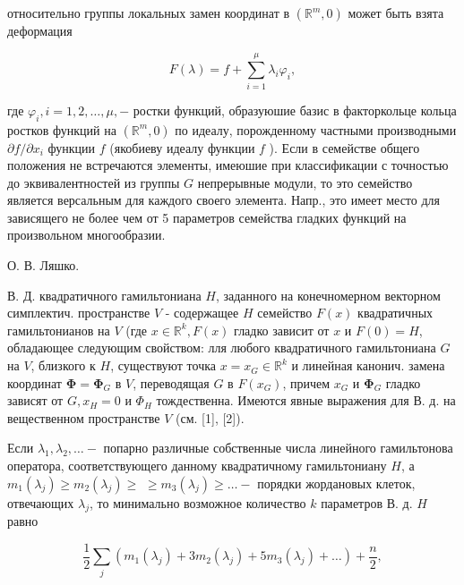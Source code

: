 \documentclass[10pt]{article}
\begin{document}
относительно группы локальных замен координат в $\left(\mathbb{R}^{m}, 0\right)$ может быть взята деформация



\[

F(\lambda)=f+\sum_{i=1}^{\mu} \lambda_{i} \varphi_{i},

\]



где $\varphi_{i}, i=1,2, \ldots, \mu,-$ ростки функций, образуюшие базис в факторкольце кольца ростков функций на $\left(\mathbb{R}^{m}, 0\right)$ по идеалу, порожденному частными производными $\partial f / \partial x_{i}$ функции $f$ (якобиеву идеалу функции $f$ ). Если в семействе общего положения не встречаются элементы, имеюшие при классификации с точностью до эквивалентностей из группы $G$ непрерывные модули, то это семейство является версальным для каждого своего элемента. Напр., это имеет место для зависящего не более чем от 5 параметров семейства гладких функций на произвольном многообразии.



О. В. Ляшко.



В. Д. квадратичного гамильтониана $H$, заданного на конечномерном векторном симплектич. пространстве $V$ - содержащее $H$ семейство $F(x)$ квадратичных гамильтонианов на $V$ (где $x \in \mathbb{R}^{k}, F(x)$ гладко зависит от $x$ и $F(0)=H$, обладающее следующим свойством: лля любого квадратичного гамильтониана $G$ на $V$, близкого к $H$, существуют точка $x=x_{G} \in \mathbb{R}^{k}$ и линейная канонич. замена координат $\boldsymbol{\Phi}=\boldsymbol{\Phi}_{G}$ в $V$, переводящая $G$ в $F\left(x_{G}\right)$, причем $x_{G}$ и $\boldsymbol{\Phi}_{G}$ гладко зависят от $G, x_{H}=0$ и $\Phi_{H}$ тождественна. Имеются явные выражения для В. д. на вещественном пространстве $V$ (см. [1], [2]).



Если $\lambda_{1}, \lambda_{2}, \ldots-$ попарно различные собственные числа линейного гамильтонова оператора, соответствующего данному квадратичному гамильтониану $H$, а $m_{1}\left(\lambda_{j}\right) \geqslant m_{2}\left(\lambda_{j}\right) \geqslant$ $\geqslant m_{3}\left(\lambda_{j}\right) \geqslant \ldots-$ порядки жордановых клеток, отвечающих $\lambda_{j}$, то минимально возможное количество $k$ параметров В. д. $H$ равно



\[

\frac{1}{2} \sum_{j}\left(m_{1}\left(\lambda_{j}\right)+3 m_{2}\left(\lambda_{j}\right)+5 m_{3}\left(\lambda_{j}\right)+\ldots\right)+\frac{n}{2},

\]
\end{document}
